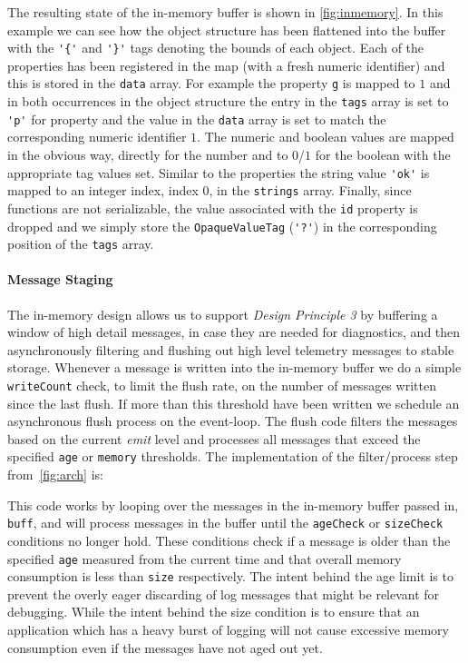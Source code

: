 The resulting state of the in-memory buffer is shown in \autoref{fig:inmemory}. 
In this example we can see how the object structure has been flattened into 
the buffer with the \lstinline!'{'! and \lstinline!'}'! tags denoting the bounds 
of each object. Each of the properties has been registered in the map (with a fresh 
numeric identifier) and this is stored in the \texttt{data} array. For example the 
property \lstinline!g! is mapped to $1$ and in both occurrences in the object 
structure the entry in the \texttt{tags} array is set to \lstinline!'p'! for 
property and the value in the \texttt{data} array is set to match the corresponding 
numeric identifier $1$. The numeric and boolean values are mapped in the obvious 
way, directly for the number and to $0$/$1$ for the boolean with the appropriate 
tag values set. Similar to the properties the string value \lstinline!'ok'! is 
mapped to an integer index, index $0$, in the \texttt{strings} array. Finally, 
since functions are not serializable, the value associated with the \lstinline!id! 
property is dropped and we simply store the \texttt{OpaqueValueTag} (\lstinline!'?'!) 
in the corresponding position of the \texttt{tags} array.

\paragraph{Message Staging}
\noindent
The in-memory design allows us to support \emph{Design Principle 3} by buffering a 
window of high detail messages, in case they are needed for diagnostics, and then 
asynchronously filtering and flushing out high level telemetry messages to stable 
storage. Whenever a message is written into the in-memory buffer we do a simple 
\texttt{writeCount} check, to limit the flush rate, on the number of messages written 
since the last flush. If more than this threshold have been written we schedule an 
asynchronous flush process on the event-loop. The flush code filters the messages 
based on the current \emph{emit} level and processes all messages that exceed the 
specified \texttt{age} or \texttt{memory} thresholds. The implementation of the 
filter/process step from~\autoref{fig:arch} is:



This code works by looping over the messages in the in-memory buffer passed in, 
\lstinline!buff!, and will process  messages in the buffer until the 
\lstinline!ageCheck! or \lstinline!sizeCheck! conditions no longer 
hold. These conditions check if a message is older than the specified 
\lstinline!age! measured from the current time and that overall memory 
consumption is less than \lstinline!size! respectively. The intent behind the 
age limit is to prevent the overly eager discarding of log messages that might 
be relevant for debugging. While the intent behind the size condition is to ensure 
that an application which has a heavy burst of logging will not cause excessive 
memory consumption even if the messages have not aged out yet.


